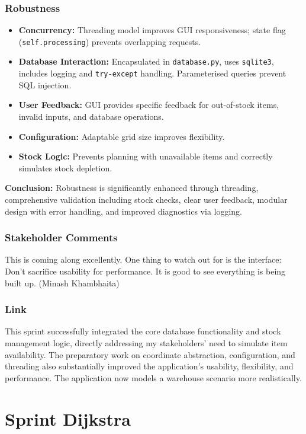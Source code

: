 \subsubsection{Robustness}
	\begin{itemize}
		\item \textbf{Concurrency:} Threading model improves GUI responsiveness; state flag (\verb|self.processing|) prevents overlapping requests.
		\item \textbf{Database Interaction:} Encapsulated in \verb|database.py|, uses \verb|sqlite3|, includes logging and \verb|try-except| handling. Parameterised queries prevent SQL injection.
		\item \textbf{User Feedback:} GUI provides specific feedback for out-of-stock items, invalid inputs, and database operations.
		\item \textbf{Configuration:} Adaptable grid size improves flexibility.
		\item \textbf{Stock Logic:} Prevents planning with unavailable items and correctly simulates stock depletion.
	\end{itemize}
	\textbf{Conclusion:} Robustness is significantly enhanced through threading, comprehensive validation including stock checks, clear user feedback, modular design with error handling, and improved diagnostics via logging.

\subsubsection{Stakeholder Comments}

This is coming along excellently. One thing to watch out for is the interface: Don't sacrifice usability for performance. It is good to see everything is being built up. (Minash Khambhaita)		


\subsubsection{Link}
This sprint successfully integrated the core database functionality and stock management logic, directly addressing my stakeholders' need to simulate item availability. The preparatory work on coordinate abstraction, configuration, and threading also substantially improved the application's usability, flexibility, and performance. The application now models a warehouse scenario more realistically.

\section{Sprint Dijkstra}

